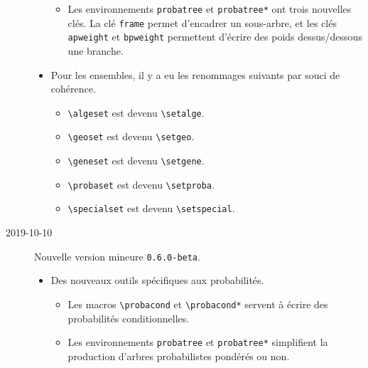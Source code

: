 \documentclass[12pt,a4paper]{article}
\newcommand\env[1]{\texttt{#1}}
\newcommand\macro[1]{\env{\textbackslash{}#1}}
\theoremstyle{definition}
\begin{document}
\begin{description}
\begin{itemize}[itemsep=.5em]
\begin{itemize}[itemsep=.5em]
            \item Les environnements \verb+probatree+ et \verb+probatree*+ ont trois nouvelles clés.
                  La clé \verb+frame+ permet d'encadrer un sous-arbre, et les clés \verb+apweight+ et \verb+bpweight+ permettent d'écrire des poids dessus/dessous une branche.
        \end{itemize}
    
    
        \item Pour les ensembles, il y a eu les renommages suivants par souci de cohérence.
        \begin{itemize}[itemsep=.5em]
            \item \macro{algeset} est devenu \macro{setalge}.
    
            \item \macro{geoset} est devenu \macro{setgeo}.
    
            \item \macro{geneset} est devenu \macro{setgene}.
    
            \item \macro{probaset} est devenu \macro{setproba}.
    
            \item \macro{specialset} est devenu \macro{setspecial}.
        \end{itemize}
    \end{itemize}


    \medskip
    \item[2019-10-10] Nouvelle version mineure \verb+0.6.0-beta+.
    
    \begin{itemize}[itemsep=.5em]
        \item Des nouveaux outils spécifiques aux probabilités.
        \begin{itemize}[itemsep=.5em]
            \item Les macros \macro{probacond} et \macro{probacond*} servent à écrire des probabilités conditionnelles.
    
            \item Les environnements \verb+probatree+ et \verb+probatree*+ simplifient la production d'arbres probabilistes pondérés ou non.
        \end{itemize}
    
    

\end{itemize}
\end{description}
\end{document}
